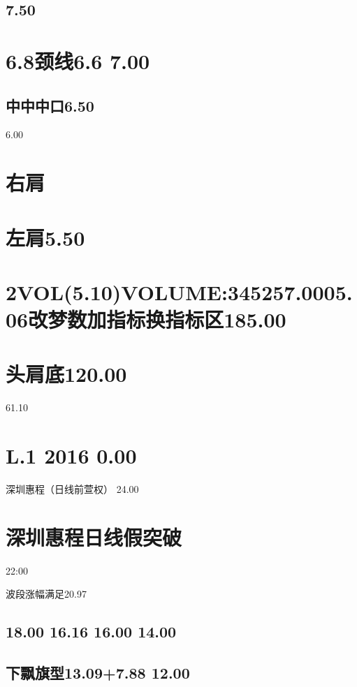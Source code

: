 \documentclass{article}
\begin{document}
\subsection{7.50}

\section{6.8颈线6.6 7.00}

\subsection{中中中口6.50}

6.00

\section{右肩}

\section{左肩5.50}

\section{2VOL(5.10)VOLUME:345257.0005.06改梦数加指标换指标区185.00}

\section{头肩底120.00}

61.10

\section{L.1 2016 0.00}

深圳惠程（日线前萱权） 24.00

\section{深圳惠程日线假突破}

22:00

波段涨幅满足20.97

\subsection{18.00 16.16 16.00 14.00}

\subsection{下飘旗型13.09+7.88 12.00}
\end{document}
